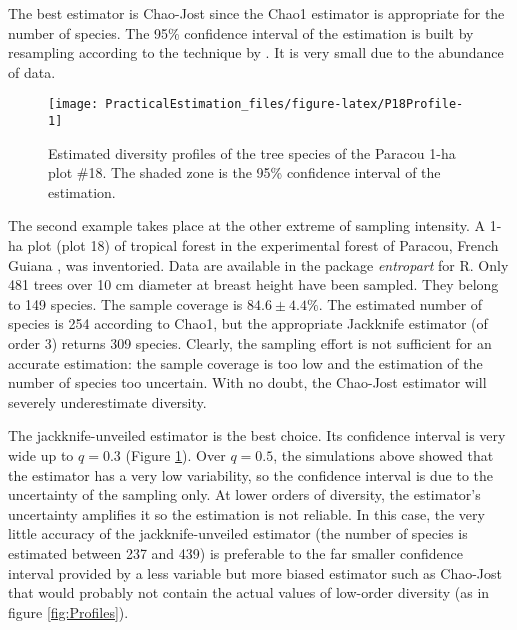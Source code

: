 \documentclass[fleqn,10pt]{latex/stylish_article} %
\begin{document}
The best estimator is Chao-Jost since the Chao1 estimator is appropriate for the number of species.
The 95\% confidence interval of the estimation is built by resampling according to the technique by \citet{Chao2015}.
It is very small due to the abundance of data.



\scriptsize

\begin{figure}

{\centering \texttt{[image: PracticalEstimation\_files/figure-latex/P18Profile-1]} 

}

\caption{Estimated diversity profiles of the tree species of the Paracou 1-ha plot \#18. The shaded zone is the 95\% confidence interval of the estimation.}\label{fig:P18Profile}
\end{figure}

\normalsize

The second example takes place at the other extreme of sampling intensity.
A 1-ha plot (plot 18) of tropical forest in the experimental forest of Paracou, French Guiana \citep{Gourlet-Fleury2004}, was inventoried.
Data are available in the package \emph{entropart} for R.
Only 481 trees over 10 cm diameter at breast height have been sampled.
They belong to 149 species.
The sample coverage is \(84.6 \pm 4.4\%\).
The estimated number of species is 254 according to Chao1, but the appropriate Jackknife estimator (of order 3) returns 309 species.
Clearly, the sampling effort is not sufficient for an accurate estimation: the sample coverage is too low and the estimation of the number of species too uncertain.
With no doubt, the Chao-Jost estimator will severely underestimate diversity.

The jackknife-unveiled estimator is the best choice.
Its confidence interval is very wide up to \(q=0.3\) (Figure \ref{fig:P18Profile}).
Over \(q=0.5\), the simulations above showed that the estimator has a very low variability, so the confidence interval is due to the uncertainty of the sampling only.
At lower orders of diversity, the estimator's uncertainty amplifies it so the estimation is not reliable.
In this case, the very little accuracy of the jackknife-unveiled estimator (the number of species is estimated between 237 and 439) is preferable to the far smaller confidence interval provided by a less variable but more biased estimator such as Chao-Jost that would probably not contain the actual values of low-order diversity (as in figure \ref{fig:Profiles}).
\end{document}
